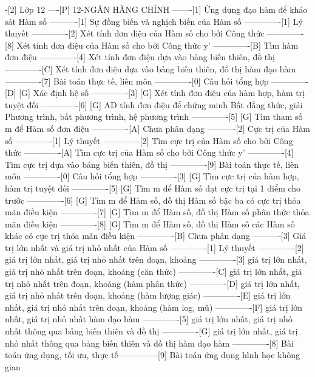 -[2] Lớp 12
----[P] 12-NGÂN HÀNG CHÍNH
-------[1] Ứng dụng đạo hàm để khảo sát Hàm số
----------[1] Sự đồng biến và nghịch biến của Hàm số
-------------[1] Lý thuyết
-------------[2] Xét tính đơn điệu của Hàm số cho bởi Công thức
-------------[8] Xét tính đơn điệu của Hàm số cho bởi Công thức y'
-------------[B] Tìm hàm đơn điệu 
-------------[4] Xét tính đơn điệu dựa vào bảng biến thiên, đồ thị
-------------[C] Xét tính đơn điệu dựa vào bảng biến thiên, đồ thị hàm đạo hàm
-------------[7] Bài toán thực tế, liên môn
-------------[0] Câu hỏi tổng hợp
-------------[D] [G] Xác định hệ số
-------------[3] [G] Xét tính đơn điệu của hàm hợp, hàm trị tuyệt đối
-------------[6] [G] AD tính đơn điệu để chứng minh Bất đẳng thức, giải Phương trình, bất phương trình, hệ phương trình
-------------[5] [G] Tìm tham số m để Hàm số đơn điệu
-------------[A] Chưa phân dạng
----------[2] Cực trị của Hàm số
-------------[1] Lý thuyết
-------------[2] Tìm cực trị của Hàm số cho bởi Công thức
-------------[A] Tìm cực trị của Hàm số cho bởi Công thức y'
-------------[4] Tìm cực trị dựa vào bảng biến thiên, đồ thị
-------------[9] Bài toán thực tế, liên môn
-------------[0] Câu hỏi tổng hợp
-------------[3] [G] Tìm cực trị của hàm hợp, hàm trị tuyệt đối
-------------[5] [G] Tìm m để Hàm số đạt cực trị tại 1 điểm cho trước
-------------[6] [G] Tìm m để Hàm số, đồ thị Hàm số bậc ba có cực trị thỏa mãn điều kiện
-------------[7] [G] Tìm m để Hàm số, đồ thị Hàm số phân thức thỏa mãn điều kiện
-------------[8] [G] Tìm m để Hàm số, đồ thị Hàm số các Hàm số khác có cực trị thỏa mãn điều kiện
-------------[B] Chưa phân dạng
----------[3] Giá trị lớn nhất và giá trị nhỏ nhất của Hàm số
-------------[1] Lý thuyết
-------------[2] giá trị lớn nhất, giá trị nhỏ nhất trên đoạn, khoảng
-------------[3] giá trị lớn nhất, giá trị nhỏ nhất trên đoạn, khoảng (căn thức)
-------------[C] giá trị lớn nhất, giá trị nhỏ nhất trên đoạn, khoảng (hàm phân thức)
-------------[D] giá trị lớn nhất, giá trị nhỏ nhất trên đoạn, khoảng (hàm lượng giác)
-------------[E] giá trị lớn nhất, giá trị nhỏ nhất trên đoạn, khoảng (hàm log, mũ)
-------------[F] giá trị lớn nhất, giá trị nhỏ nhất hàm đạo hàm
-------------[5] giá trị lớn nhất, giá trị nhỏ nhất thông qua bảng biến thiên và đồ thị
-------------[G] giá trị lớn nhất, giá trị nhỏ nhất thông qua bảng biến thiên và đồ thị hàm đạo hàm
-------------[8] Bài toán ứng dụng, tối ưu, thực tế
-------------[9] Bài toán ứng dụng hình học không gian
